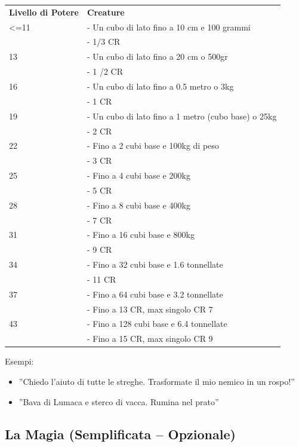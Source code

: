 \documentclass[a4paper,11pt,twoside,openany]{book}
\begin{document}
	\bigskip
	
	\begin{tabular}{L{3cm} L{10cm}}
		\toprule
		\textbf{Livello di Potere} & \textbf{Creature}\tabularnewline
		<=11& - Un cubo di lato fino a 10 cm e 100 grammi\\
		&- 1/3 CR\\
		13& - Un cubo di lato fino a 20 cm o 500gr\\
		&- 1 /2 CR\\
		16& - Un cubo di lato fino a 0.5 metro o 3kg\\
		&- 1 CR\\
		19& - Un cubo di lato fino a 1 metro (cubo base) o 25kg\\
		&- 2 CR\\
		22& - Fino a 2 cubi base e 100kg di peso\\
		&- 3 CR\\
		25& - Fino a 4 cubi base e 200kg\\
		&- 5 CR\\
		28& - Fino a 8 cubi base e 400kg\\
		&- 7 CR\\
		31& - Fino a 16 cubi base e 800kg\\
		&- 9 CR\\
		34& - Fino a 32 cubi base e 1.6 tonnellate\\
		&- 11 CR\\
		37& - Fino a 64 cubi base e 3.2 tonnellate\\
		&- Fino a 13 CR, max singolo CR 7\\
		43& - Fino a 128 cubi base e 6.4 tonnellate\\
		&- Fino a 15 CR, max singolo CR 9\\
	\end{tabular}
	
	\bigskip
	
	
	Esempi:
	\begin{itemize}
		\item 
		''Chiedo l'aiuto di tutte le streghe. Trasformate il mio nemico in un rospo!'' 
		\item 
		''Bava di Lumaca e sterco di vacca. Rumina nel prato'' 
	\end{itemize}
	
	\pagebreak
	
	\subsection{La Magia (Semplificata -- Opzionale)}
	
\end{document}

